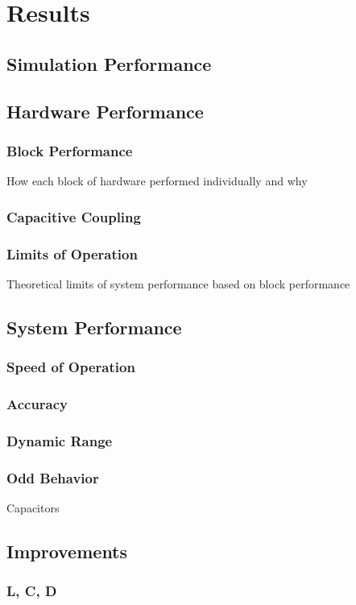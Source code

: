 \chapter{Results}

\section{Simulation Performance}

\section{Hardware Performance}
\subsection{Block Performance}
How each block of hardware performed individually and why
\subsection{Capacitive Coupling}
\subsection{Limits of Operation}
Theoretical limits of system performance based on block performance

\section{System Performance}
\subsection{Speed of Operation}
\subsection{Accuracy}
\subsection{Dynamic Range}
\subsection{Odd Behavior}
Capacitors

\section{Improvements}
\subsection{L, C, D}
